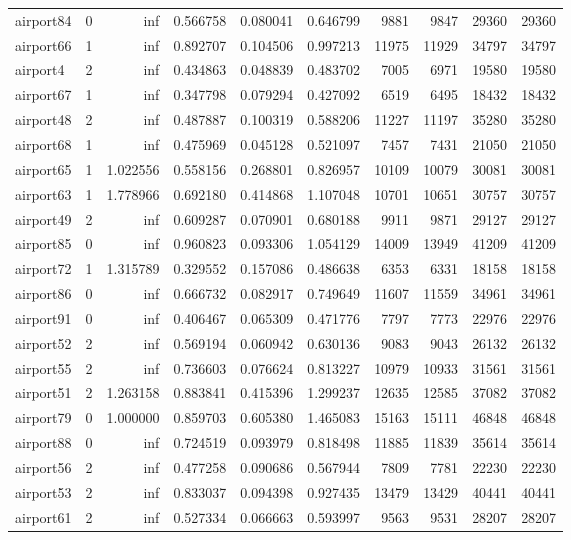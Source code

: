 \begin{longtable}{|l|r|r|r|r|r|r|r|r|r|}
airport84 & 0 & inf & 0.566758 & 0.080041 & 0.646799 & 9881 & 9847 & 29360 & 29360 \\
airport66 & 1 & inf & 0.892707 & 0.104506 & 0.997213 & 11975 & 11929 & 34797 & 34797 \\
airport4 & 2 & inf & 0.434863 & 0.048839 & 0.483702 & 7005 & 6971 & 19580 & 19580 \\
airport67 & 1 & inf & 0.347798 & 0.079294 & 0.427092 & 6519 & 6495 & 18432 & 18432 \\
airport48 & 2 & inf & 0.487887 & 0.100319 & 0.588206 & 11227 & 11197 & 35280 & 35280 \\
airport68 & 1 & inf & 0.475969 & 0.045128 & 0.521097 & 7457 & 7431 & 21050 & 21050 \\
airport65 & 1 & 1.022556 & 0.558156 & 0.268801 & 0.826957 & 10109 & 10079 & 30081 & 30081 \\
airport63 & 1 & 1.778966 & 0.692180 & 0.414868 & 1.107048 & 10701 & 10651 & 30757 & 30757 \\
airport49 & 2 & inf & 0.609287 & 0.070901 & 0.680188 & 9911 & 9871 & 29127 & 29127 \\
airport85 & 0 & inf & 0.960823 & 0.093306 & 1.054129 & 14009 & 13949 & 41209 & 41209 \\
airport72 & 1 & 1.315789 & 0.329552 & 0.157086 & 0.486638 & 6353 & 6331 & 18158 & 18158 \\
airport86 & 0 & inf & 0.666732 & 0.082917 & 0.749649 & 11607 & 11559 & 34961 & 34961 \\
airport91 & 0 & inf & 0.406467 & 0.065309 & 0.471776 & 7797 & 7773 & 22976 & 22976 \\
airport52 & 2 & inf & 0.569194 & 0.060942 & 0.630136 & 9083 & 9043 & 26132 & 26132 \\
airport55 & 2 & inf & 0.736603 & 0.076624 & 0.813227 & 10979 & 10933 & 31561 & 31561 \\
airport51 & 2 & 1.263158 & 0.883841 & 0.415396 & 1.299237 & 12635 & 12585 & 37082 & 37082 \\
airport79 & 0 & 1.000000 & 0.859703 & 0.605380 & 1.465083 & 15163 & 15111 & 46848 & 46848 \\
airport88 & 0 & inf & 0.724519 & 0.093979 & 0.818498 & 11885 & 11839 & 35614 & 35614 \\
airport56 & 2 & inf & 0.477258 & 0.090686 & 0.567944 & 7809 & 7781 & 22230 & 22230 \\
airport53 & 2 & inf & 0.833037 & 0.094398 & 0.927435 & 13479 & 13429 & 40441 & 40441 \\
airport61 & 2 & inf & 0.527334 & 0.066663 & 0.593997 & 9563 & 9531 & 28207 & 28207 \\

\end{longtable}
